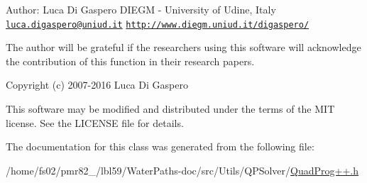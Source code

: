 Author\+: Luca Di Gaspero D\+I\+E\+GM -\/ University of Udine, Italy \href{mailto:luca.digaspero@uniud.it}{\tt luca.\+digaspero@uniud.\+it} \href{http://www.diegm.uniud.it/digaspero/}{\tt http\+://www.\+diegm.\+uniud.\+it/digaspero/}

The author will be grateful if the researchers using this software will acknowledge the contribution of this function in their research papers.

Copyright (c) 2007-\/2016 Luca Di Gaspero

This software may be modified and distributed under the terms of the M\+IT license. See the L\+I\+C\+E\+N\+SE file for details. 

The documentation for this class was generated from the following file\+:\begin{DoxyCompactItemize}
\item 
/home/fs02/pmr82\+\_/lbl59/\+Water\+Paths-\/doc/src/\+Utils/\+Q\+P\+Solver/\mbox{\hyperlink{QuadProg_09_09_8h}{Quad\+Prog++.\+h}}\end{DoxyCompactItemize}
